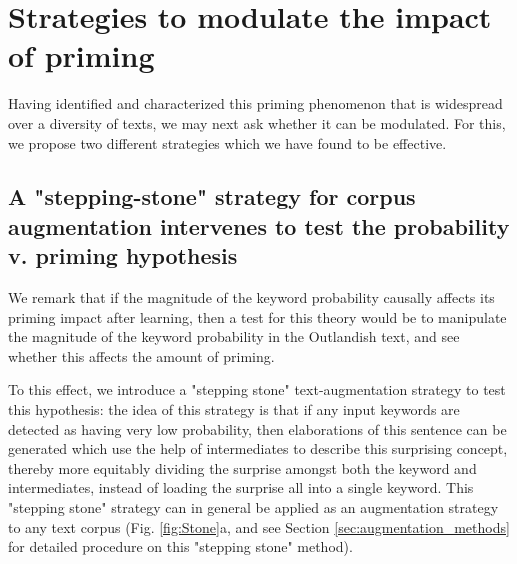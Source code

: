 \documentclass[11pt, a4paper, logo, copyright]{googledeepmind}
\theoremstyle{plain}
\theoremstyle{definition}
\theoremstyle{remark}
\begin{document}
\section{Strategies to modulate the impact of priming}
\label{sec:modulation}

Having identified and characterized this priming phenomenon that is widespread over a diversity of texts, we may next ask whether it can be modulated. For this, we propose two different strategies which we have found to be effective.




\subsection{A "stepping-stone" strategy for corpus augmentation intervenes to test the probability v. priming hypothesis }
\label{sec:stone}

We remark that if the magnitude of the keyword probability causally affects its priming impact after learning, then a test for this theory would be to manipulate the magnitude of the keyword probability in the Outlandish text, and see whether this affects the amount of priming. 

To this effect, we introduce a "stepping stone" text-augmentation strategy to test this hypothesis:
the idea of this strategy is that if any input keywords are detected as having very low probability, then elaborations of this sentence can be generated which use the help of intermediates to describe this surprising concept, thereby more equitably dividing the surprise amongst both the keyword and intermediates, instead of loading the surprise all into a single keyword. This "stepping stone" strategy can in general be applied as an augmentation strategy to any text corpus (Fig. \ref{fig:Stone}a, and see Section \ref{sec:augmentation_methods} for detailed procedure on this "stepping stone" method). 
\end{document}
